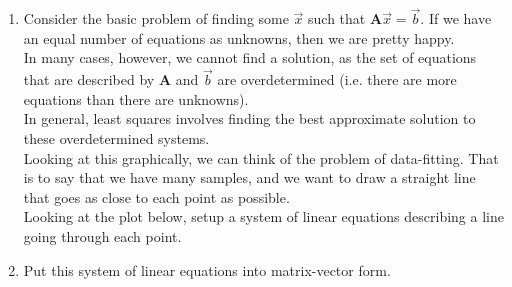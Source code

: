\begin{enumerate}
\item{Consider the basic problem of finding some $\vec{x}$ such that $\mathbf{A}\vec{x} = \vec{b}$. If we have an equal number of equations as unknowns, then we are pretty happy.\\

In many cases, however, we cannot find a solution, as the set of equations that are described by $\mathbf{A}$ and $\vec{b}$ are overdetermined (i.e. there are more equations than there are unknowns).\\

In general, least squares involves finding the best approximate solution to these overdetermined systems.\\
    
Looking at this graphically, we can think of the problem of data-fitting. That is to say that we have many samples, and we want to draw a straight line that goes as close to each point as possible.\\

Looking at the plot below, setup a system of linear equations describing a line going through each point.\\

\begin{center}
\end{center}
}
    

\item{
    Put this system of linear equations into matrix-vector form.
}


\end{enumerate}
